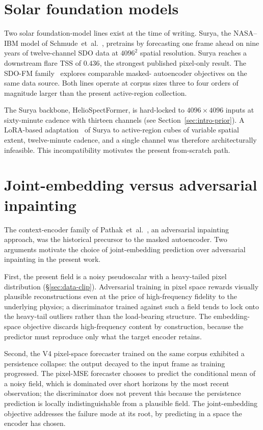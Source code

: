 \section{Solar foundation models}
\label{sec:bg-surya}

Two solar foundation-model lines exist at the time of writing.
Surya, the NASA--IBM model of
Schmude~et~al.~\cite{surya2025,suryabench2025}, pretrains by
forecasting one frame ahead on nine years of twelve-channel SDO
data at $4096^{2}$ spatial resolution. Surya reaches a downstream
flare TSS of $0.436$, the strongest published pixel-only result.
The SDO-FM family~\cite{sdofm2024} explores comparable masked-
autoencoder objectives on the same data source. Both lines
operate at corpus sizes three to four orders of magnitude larger
than the present active-region collection.

The Surya backbone, HelioSpectFormer, is hard-locked to
$4096 \times 4096$ inputs at sixty-minute cadence with thirteen
channels (see Section~\ref{sec:intro-prior}). A LoRA-based
adaptation~\cite{hu2021lora} of Surya to active-region cubes
of variable spatial extent, twelve-minute cadence, and a single
channel was therefore architecturally infeasible. This
incompatibility motivates the present from-scratch path.

\section{Joint-embedding versus adversarial inpainting}
\label{sec:bg-vs-pathak}

The context-encoder family of
Pathak~et~al.~\cite{pathak2016contextencoders}, an adversarial
inpainting approach, was the historical precursor to the masked
autoencoder. Two arguments motivate the choice of
joint-embedding prediction over adversarial inpainting in the
present work.

First, the present field is a noisy pseudoscalar with a
heavy-tailed pixel distribution (\S\ref{sec:data-clip}).
Adversarial training in pixel space rewards visually plausible
reconstructions even at the price of high-frequency fidelity to
the underlying physics; a discriminator trained against such a
field tends to lock onto the heavy-tail outliers rather than the
load-bearing structure. The embedding-space objective discards
high-frequency content by construction, because the predictor
must reproduce only what the target encoder retains.

Second, the V4 pixel-space forecaster trained on the same corpus
exhibited a persistence collapse: the output decayed to the
input frame as training progressed. The pixel-MSE forecaster
chooses to predict the conditional mean of a noisy field, which
is dominated over short horizons by the most recent observation;
the discriminator does not prevent this because the persistence
prediction is locally indistinguishable from a plausible field.
The joint-embedding objective addresses the failure mode at its
root, by predicting in a space the encoder has chosen.

